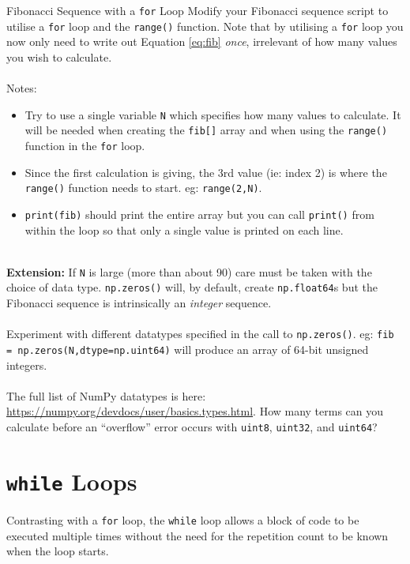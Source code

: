 \documentclass{lab}
\begin{document}
\begin{task}{Fibonacci Sequence with a \texttt{for} Loop}{}
Modify your Fibonacci sequence script to utilise a \texttt{for} loop and the \texttt{range()} function. Note that by utilising a \texttt{for} loop you now only need to write out Equation \ref{eq:fib} \textit{once}, irrelevant of how many values you wish to calculate.
\\~\\
Notes:
\\
\begin{itemize}
\item Try to use a single variable \texttt{N} which specifies how many values to calculate. It will be needed when creating the \texttt{fib[]} array and when using the \texttt{range()} function in the \texttt{for} loop.
\item Since the first calculation is giving, the 3rd value (ie: index 2) is where the \texttt{range()} function needs to start. eg: \texttt{range(2,N)}.
\item \texttt{print(fib)} should print the entire array but you can call \texttt{print()} from within the loop so that only a single value is printed on each line.
\end{itemize}
~\\
\textbf{Extension:} If \texttt{N} is large (more than about 90) care must be taken with the choice of data type. \texttt{np.zeros()} will, by default, create \texttt{np.float64}s but the Fibonacci sequence is intrinsically an \textit{integer} sequence.
\\~\\
Experiment with different datatypes specified in the call to \texttt{np.zeros()}. eg: \texttt{fib = np.zeros(N,dtype=np.uint64)} will produce an array of 64-bit unsigned integers.
\\~\\
The full list of NumPy datatypes is here: \url{https://numpy.org/devdocs/user/basics.types.html}. How many terms can you calculate before an ``overflow'' error occurs with \texttt{uint8}, \texttt{uint32}, and \texttt{uint64}?

\end{task}

\pagebreak

\section{\texttt{while} Loops}
Contrasting with a \texttt{for} loop, the \texttt{while} loop allows a block of code to be executed multiple times without the need for the repetition count to be known when the loop starts.
\end{document}
